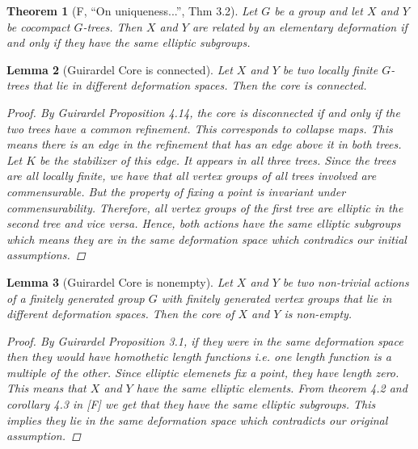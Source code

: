 \documentclass{article}
\theoremstyle{mystyle}
\newtheorem{thm}{Theorem}[section]
\newtheorem{lem}[thm]{Lemma}
\theoremstyle{remark}
\begin{document}
\begin{thm}[F, ``On uniqueness...'', Thm 3.2]
\label{thm:forester}
Let $G$ be a group and let $X$ and $Y$ be cocompact $G$-trees. Then $X$ and $Y$ are related by an elementary deformation if and only if they have the same elliptic subgroups.
\end{thm}

\begin{lem}
    [Guirardel Core is connected]
    \label{lem:coreconnected} 
    Let \(X\) and \(Y\) be two locally finite \(G\)-trees that lie in different deformation spaces. Then the core is connected.
    \begin{proof}
        By Guirardel Proposition 4.14, the core is disconnected if and only if the two trees have a common refinement. This corresponds to collapse maps. This means there is an edge in the refinement that has an edge above it in both trees. Let \(K\) be the stabilizer of this edge. It appears in all three trees. Since the trees are all locally finite, we have that all vertex groups of all trees involved are commensurable. But the property of fixing a point is invariant under commensurability. Therefore, all vertex groups of the first tree are elliptic in the second tree and vice versa. Hence, both actions have the same elliptic subgroups which means they are in the same deformation space which contradics our initial assumptions.
    \end{proof}
\end{lem}

\begin{lem}
    [Guirardel Core is nonempty]
    \label{lem:corenonempty} 
    Let \(X\) and \(Y\) be two non-trivial actions of a finitely generated group \(G\) with finitely generated vertex groups that lie in different deformation spaces. Then the core of \(X\) and \(Y\) is non-empty.
    \begin{proof}
        By Guirardel Proposition 3.1, if they were in the same deformation space then they would have homothetic length functions i.e. one length function is a multiple of the other. Since elliptic elemenets fix a point, they have length zero. This means that \(X\) and \(Y\) have the same elliptic elements. From theorem 4.2 and corollary 4.3 in [F] we get that they have the same elliptic subgroups. This implies they lie in the same deformation space which contradicts our original assumption.
    \end{proof}
\end{lem}
\end{document}
